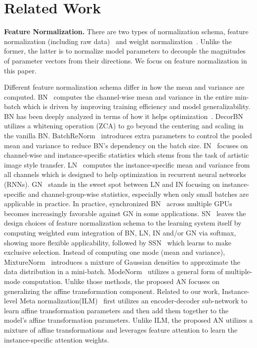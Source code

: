 \documentclass[runningheads]{llncs}
\begin{document}
\section{Related Work}
\textbf{Feature Normalization.}
There are two types of normalization schema, feature normalization (including raw data)~\cite{BatchNorm,BatchReNorm,LayerNorm,InstNorm,GroupNorm,SwitchNorm,SSN,MixtureNorm,ModeNorm} and weight normalization~\cite{WN,OrthWtsNorm}. Unlike the former, the latter is to normalize model parameters to decouple the magnitudes of parameter vectors from their directions.
We focus on feature normalization in this paper. 

Different feature normalization schema differ in how the mean and variance are computed. BN~\cite{BatchNorm} computes the channel-wise mean and variance in the entire min-batch which is driven by improving training efficiency and model generalizability. BN has been deeply analyzed in terms of how it helps optimization~\cite{HowBNWorks}. DecorBN~\cite{DecorBN} utilizes a whitening operation (ZCA) to go beyond the centering and scaling in the vanilla BN. BatchReNorm~\cite{BatchReNorm} introduces extra parameters to control the pooled mean and variance to reduce BN's dependency on the batch size. IN~\cite{InstNorm} focuses on channel-wise and instance-specific statistics which stems from the task of artistic image style transfer. LN~\cite{LayerNorm} computes the instance-specific mean and variance from all channels which is designed to help optimization in recurrent neural networks (RNNs). GN~\cite{GroupNorm} stands in the sweet spot between LN and IN focusing on instance-specific and channel-group-wise statistics, especially when only small batches are applicable in practice. In practice, synchronized BN~\cite{SyncBN} across multiple GPUs becomes increasingly favorable against GN in some applications. SN~\cite{SwitchNorm} leaves the design choices of feature normalization schema to the learning system itself by computing weighted sum integration of BN, LN, IN and/or GN via softmax, showing more flexible applicability, followed by SSN~\cite{SSN} which learns to make exclusive selection. Instead of computing one mode (mean and variance), MixtureNorm~\cite{MixtureNorm} introduces a mixture of Gaussian densities to approximate the data distribution in a mini-batch. ModeNorm~\cite{ModeNorm} utilizes a general form of multiple-mode computation. Unlike those methods, the proposed AN focuses on generalizing the affine transformation component. Related to our work, Instance-level Meta normalization(ILM)~\cite{InstMetaNorm} first utilizes an encoder-decoder sub-network to learn affine transformation parameters and then add them together to the model's affine transformation parameters. Unlike ILM, the proposed AN utilizes a mixture of affine transformations and leverages feature attention to learn the instance-specific attention weights.
\end{document}
